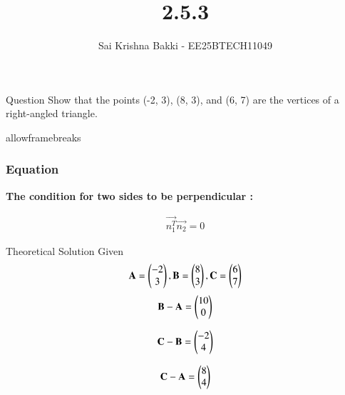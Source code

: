 \documentclass{beamer}
\title %
{2.5.3}
\date{}
\author %
{Sai Krishna Bakki - EE25BTECH11049}
\begin{document}
\frame{\titlepage}
\begin{frame}{Question}
Show that the points (-2, 3), (8, 3), and (6, 7) are the vertices of a right-angled triangle.
\end{frame}
\begin{frame}{allowframebreaks}
		\frametitle{Equation}
	\textbf{The condition for two sides to be perpendicular : }
		\centering
		
		\label{tab:parameters}
		\begin{align*}
			\vec{n_1^T}\vec{n_2}=0
		\end{align*}
		\end{frame}	

\begin{frame}{Theoretical Solution}
Given 
\begin{align}
 \mathbf{A}=\begin{pmatrix}-2\\3\end{pmatrix},
 \mathbf{B}=\begin{pmatrix}8\\3\end{pmatrix},
 \mathbf{C}=\begin{pmatrix}6\\7\end{pmatrix}
\end{align} 
\begin{align}
   \mathbf{B}-\mathbf{A}=\begin{pmatrix}10\\0\end{pmatrix}
\end{align}

\begin{align}
   \mathbf{C}-\mathbf{B}=\begin{pmatrix}-2\\4\end{pmatrix}
\end{align}

\begin{align}
   \mathbf{C}-\mathbf{A}=\begin{pmatrix}8\\4\end{pmatrix}
\end{align}
\end{frame}	
\end{document}
